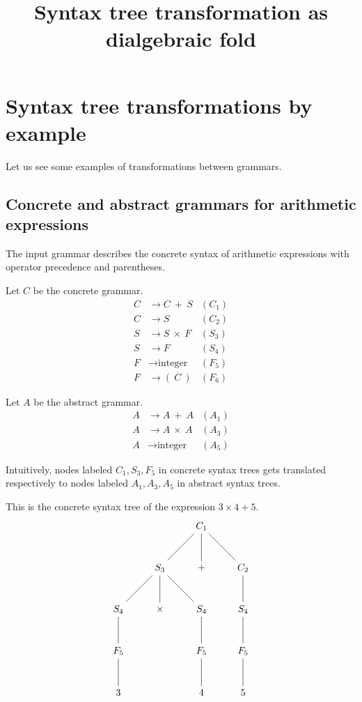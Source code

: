 \documentclass{amsart}
\gdef\R{\rightarrow}
\begin{document}
\title{Syntax tree transformation as dialgebraic fold}
\maketitle

\section{Syntax tree transformations by example}

Let us see some examples of transformations between grammars.

\subsection{Concrete and abstract grammars for arithmetic expressions}

The input grammar describes the concrete syntax of arithmetic
expressions with operator precedence and parentheses.

Let $C$ be the concrete grammar.
\begin{align*}
C &\R C~+~S & (C_1) \\
C &\R S     & (C_2) \\
S &\R S~\times~F & (S_3) \\
S &\R F     & (S_4) \\
F &\R \mbox{integer} & (F_5) \\
F &\R (~C~) & (F_6)
\end{align*}

Let $A$ be the abstract grammar.
\begin{align*}
A &\R A~+~A & (A_1) \\
A &\R A~\times~A & (A_3) \\
A &\R \mbox{integer} & (A_5)
\end{align*}

Intuitively, nodes labeled $C_1,S_3,F_5$ in concrete syntax trees
gets translated respectively to nodes labeled $A_1,A_3,A_5$ in
abstract syntax trees.

This is the concrete syntax tree of the expression $3\times4+5$.
\[
\begin{tikzpicture}
\path
node{$C_1$}
  child { node{$S_3$}
    child { node{$S_4$} child { node{$F_5$} child { node{$3$} }}}
    child { node{$\times$} }
    child { node{$S_4$} child { node{$F_5$} child { node{$4$} }}}
  }
  child { node{$+$} }
  child { node{$C_2$}
    child{ node{$S_4$} child{ node{$F_5$} child{ node{$5$} }}}
  }

;
\end{tikzpicture}
\]
\end{document}
